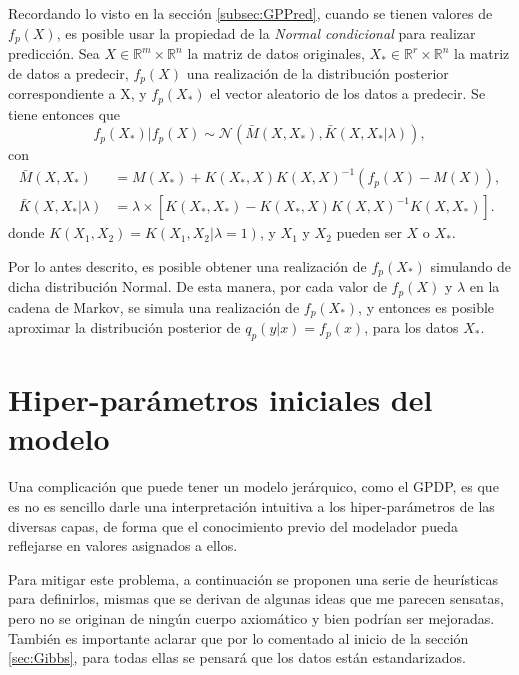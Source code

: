 Recordando lo visto en la secci\'on \ref{subsec:GPPred}, cuando se tienen valores de $f_p(X)$, es posible usar la propiedad de la \textit{Normal condicional} para realizar predicci\'on. Sea $X \in \mathbb{R}^m \times \mathbb{R}^n$ la matriz de datos originales, $X_* \in \mathbb{R}^r \times \mathbb{R}^n$ la matriz de datos a predecir, $f_p(X)$ una realizaci\'on de la distribuci\'on posterior correspondiente a X, y $f_p(X_*)$ el vector aleatorio de los datos a predecir. Se tiene entonces que 
\begin{equation*}
    f_p(X_*)|f_p(X) 
    \sim \mathcal{N}
    (\bar{M}(X,X_*),\bar{K}(X,X_*|\lambda)),
\end{equation*}
con
\begin{equation*}
\begin{aligned}
    \bar{M}(X,X_*) &= M(X_*) + K(X_*,X)K(X,X)^{-1}(f_p(X) - M(X)), \\
    \bar{K}(X,X_*|\lambda) &= 
    \lambda
    \times
    \left[
    K(X_*,X_*) -
    K(X_*,X)K(X,X)^{-1}K(X,X_*)
    \right]
    .
\end{aligned}
\end{equation*}
donde $K(X_1,X_2) = K(X_1,X_2|\lambda=1)$, y $X_1$ y $X_2$ pueden ser $X$ o $X_*$.

Por lo antes descrito, es posible obtener una realizaci\'on de $f_p(X_*)$ simulando de dicha distribuci\'on Normal. De esta manera, por cada valor de $f_p(X)$ y $\lambda$ en la cadena de Markov, se simula una realizaci\'on de $f_p(X_*)$, y entonces es posible aproximar la distribuci\'on posterior de $q_p(y|x) = f_p(x)$, para los datos $X_*$.

\section{Hiper-par\'ametros iniciales del modelo}

Una complicaci\'on que puede tener un modelo jer\'arquico, como el GPDP, es que es no es sencillo darle una interpretaci\'on intuitiva a los hiper-par\'ametros de las diversas capas, de forma que el conocimiento previo del modelador pueda reflejarse en valores asignados a ellos.

Para mitigar este problema, a continuaci\'on se proponen una serie de heur\'isticas para definirlos, mismas que se derivan de algunas ideas que me parecen sensatas, pero no se originan de ning\'un cuerpo axiom\'atico y bien podr\'ian ser mejoradas. Tambi\'en es importante aclarar que por lo comentado al inicio de la secci\'on \ref{sec:Gibbs}, para todas ellas se pensar\'a que los datos est\'an estandarizados.

